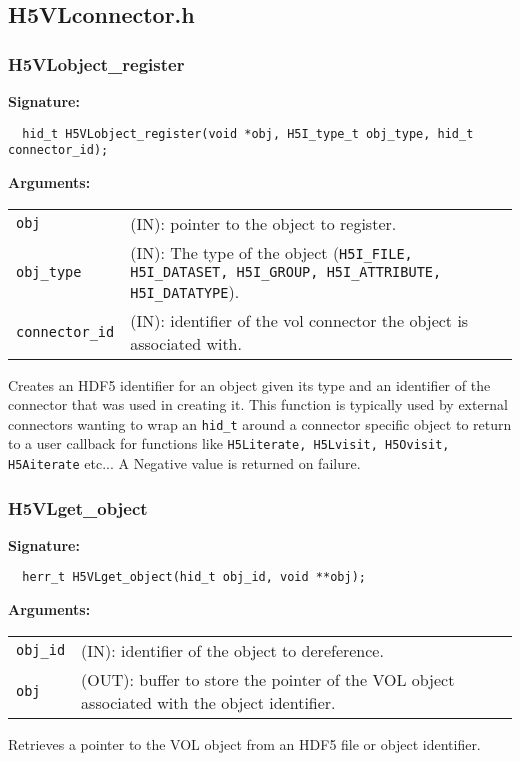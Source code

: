 \subsection{H5VLconnector.h}

\subsubsection{H5VLobject\_register}
\begin{mdframed}[style=bgbox]
\textbf{Signature:}
\begin{lstlisting}
  hid_t H5VLobject_register(void *obj, H5I_type_t obj_type, hid_t connector_id);
\end{lstlisting}

\textbf{Arguments:}\\
\begin{tabular}{l p{13.5cm}}
 {\tt obj} & (IN): pointer to the object to register.\\
 {\tt obj\_type} & (IN): The type of the object ({\tt H5I\_FILE, H5I\_DATASET, H5I\_GROUP, H5I\_ATTRIBUTE, H5I\_DATATYPE}).\\
 {\tt connector\_id} & (IN): identifier of the vol connector the object is associated with.\\
\end{tabular}
\end{mdframed}
Creates an HDF5 identifier for an object given its type and an identifier of the connector that was used in creating it. This function is typically used by external connectors wanting to wrap an {\tt hid\_t} around a connector specific object to return to a user callback for functions like {\tt H5Literate, H5Lvisit, H5Ovisit, H5Aiterate} etc... A Negative value is returned on failure.\bigskip


\subsubsection{H5VLget\_object}
\begin{mdframed}[style=bgbox]
\textbf{Signature:}
\begin{lstlisting}
  herr_t H5VLget_object(hid_t obj_id, void **obj); 
\end{lstlisting}

\textbf{Arguments:}\\
\begin{tabular}{l p{13.5cm}}
 {\tt obj\_id} & (IN): identifier of the object to dereference.\\
 {\tt obj} & (OUT): buffer to store the pointer of the VOL object associated with the object identifier.\\
\end{tabular}
\end{mdframed}
Retrieves a pointer to the VOL object from an HDF5 file or object identifier.\bigskip


